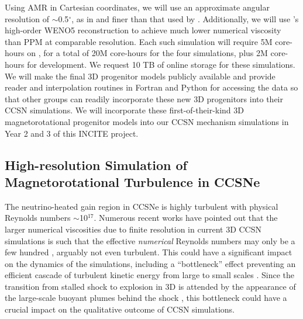Using AMR in Cartesian coordinates, we will use an approximate angular resolution of $\sim$0.5$^\circ$, as in \citep{Couch:2015a} and finer than that used by \citep{Muller:2017}.
Additionally, we will use \spark's high-order WENO5 reconstruction to achieve much lower numerical viscosity than PPM at comparable resolution.
Each such simulation will require 5M core-hours on \mira, for a total of 20M core-hours for the four simulations, plus 2M core-hours for development.
We request 10 TB of online storage for these simulations.
We will make the final 3D progenitor models publicly available and provide reader and interpolation routines in Fortran and Python for accessing the data so that other groups can readily incorporate these new 3D progenitors into their CCSN simulations.
We will incorporate these first-of-their-kind 3D magnetorotational progenitor models into our CCSN mechanism simulations in Year 2 and 3 of this INCITE project.

\subsection{High-resolution Simulation of Magnetorotational Turbulence in CCSNe}
\label{sec:Y1hero}

The neutrino-heated gain region in CCSNe is highly turbulent with physical Reynolds numbers $\sim$10$^{17}$.
Numerous recent works have pointed out that the larger numerical viscosities due to finite resolution in current 3D CCSN simulations is such that the effective {\it numerical} Reynolds numbers may only be a few hundred \citep{Couch:2015, Abdikamalov:2015, Radice:2015, Radice:2016}, arguably not even turbulent.
This could have a significant impact on the dynamics of the simulations, including a ``bottleneck'' effect preventing an efficient cascade of turbulent kinetic energy from large to small scales \citep{Hanke:2012, Couch:2013a, Abdikamalov:2015, Radice:2016}.
Since the transition from stalled shock to explosion in 3D is attended by the appearance of the large-scale buoyant plumes behind the shock \citep{Dolence:2013, Muller:2017}, this bottleneck could have a crucial impact on the qualitative outcome of CCSN simulations.

